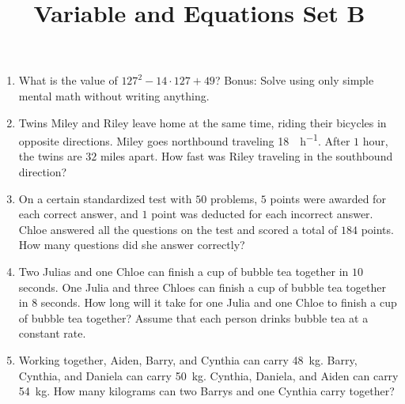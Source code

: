 \documentclass{article}
\title{Variable and Equations Set B}
\author{}
\date{}
\begin{document}
    \maketitle
    \begin{enumerate}
        \item What is the value of $127^2 - 14 \cdot 127 + 49$? Bonus: Solve
        using only simple mental math without writing anything.
        \vspace{3cm}
        \item Twins Miley and Riley leave home at the same time, riding their
        bicycles in opposite directions. Miley goes northbound traveling
        \SI{18}{\mile\per\hour}. After $1$ hour, the twins are $32$ miles apart.
        How fast was Riley traveling in the southbound direction?
        \vspace{3cm}
        \item On a certain standardized test with $50$ problems, $5$ points were
        awarded for each correct answer, and $1$ point was deducted for each
        incorrect answer. Chloe answered all the questions on the test and
        scored a total of $184$ points. How many questions did she answer
        correctly?
        \vspace{3cm}
        \item Two Julias and one Chloe can finish a cup of bubble tea together
        in $10$ seconds. One Julia and three Chloes can finish a cup of bubble
        tea together in $8$ seconds. How long will it take for one Julia and one
        Chloe to finish a cup of bubble tea together? Assume that each person
        drinks bubble tea at a constant rate.
        \vspace{3cm}
        \item Working together, Aiden, Barry, and Cynthia can carry
        \SI{48}{\kilogram}. Barry, Cynthia, and Daniela can carry
        \SI{50}{\kilogram}. Cynthia, Daniela, and Aiden can carry
        \SI{54}{\kilogram}. How many kilograms can two Barrys and one Cynthia
        carry together?
        \vspace{3cm}
    \end{enumerate}
\end{document}
